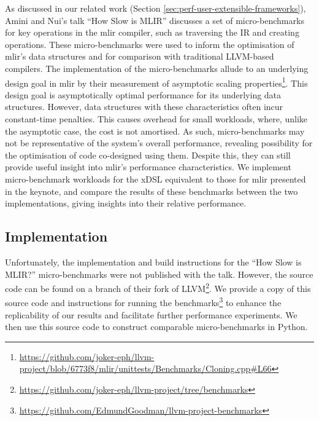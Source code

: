 As discussed in our related work (Section \ref{sec:perf-user-extensible-frameworks}), Amini and Nui's talk ``How Slow is MLIR'' \cite{aminiHowSlowMLIR2024} discusses a set of micro-benchmarks for key operations in the \ac{mlir} compiler, such as traversing the IR and creating operations.
These micro-benchmarks were used to inform the optimisation of \ac{mlir}'s data structures and for comparison with traditional LLVM-based compilers. The implementation of the micro-benchmarks allude to an underlying design goal in \ac{mlir} by their measurement of asymptotic scaling properties\footnote{\scriptsize{\url{https://github.com/joker-eph/llvm-project/blob/6773f8/mlir/unittests/Benchmarks/Cloning.cpp\#L66}}}. This design goal is asymptotically optimal performance for its underlying data structures. However, data structures with these characteristics often incur constant-time penalties.
This causes overhead for small workloads, where, unlike the asymptotic case, the cost is not amortised. As such, micro-benchmarks may not be representative of the system's overall performance, revealing possibility for the optimisation of code co-designed using them.
Despite this, they can still provide useful insight into \ac{mlir}'s performance characteristics.
We implement micro-benchmark workloads for the xDSL equivalent to those for \ac{mlir} presented in the keynote, and compare the results of these benchmarks between the two implementations, giving insights into their relative performance.

\subsection{Implementation}
\label{ssec:ubenchmark-implementation}

Unfortunately, the implementation and build instructions for the ``How Slow is MLIR?'' micro-benchmarks were not published with the talk.
However, the source code can be found on a branch of their fork of LLVM\footnote{\scriptsize{\url{https://github.com/joker-eph/llvm-project/tree/benchmarks}}}. We provide a copy of this source code and instructions for running the benchmarks\footnote{\scriptsize{\url{https://github.com/EdmundGoodman/llvm-project-benchmarks}}} to enhance the replicability of our results and facilitate further performance experiments.
We then use this source code to construct comparable micro-benchmarks in Python.

